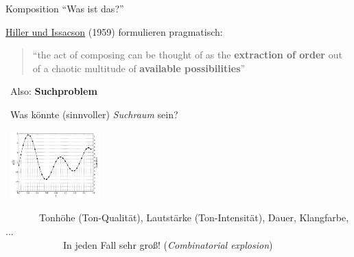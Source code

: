 \begin{frame}[t]{Komposition}
{\enquote{Was ist das?}}
	
	\underline{Hiller und Issacson} (1959) formulieren pragmatisch:
	\begin{quote}
		\enquote{the act of composing can be thought of as the \textbf{extraction of order} out of a chaotic multitude of \textbf{available possibilities}} \citep[S.1]{HillerIssacson1959}
	\end{quote}
	
	\conclude~Also: \textbf{Suchproblem}
	\bigskip
	
	\questSign~Was könnte (sinnvoller) \emph{Suchraum} sein?
	
	\vspace{-.6cm}
	\hspace{-.3cm}
	\mbox{
		\includegraphics[height=2.6cm]{img/PCM_Waveform.png}
	}

	\medskip
	~~~~~~\conclude~Tonhöhe (Ton-Qualität), Lautstärke (Ton-Intensität), Dauer, Klangfarbe, ...\\\medskip
	~~~~~~~~~~~\Conclude~In jeden Fall sehr groß! (\emph{Combinatorial explosion})
\end{frame}

